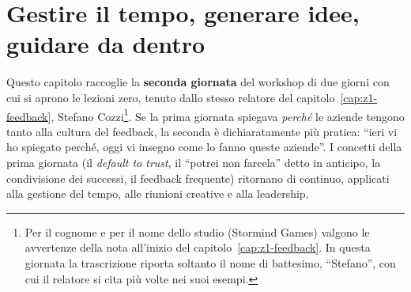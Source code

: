 %
%
%    
%    
%    
%

\chapter[Tempo, idee e leadership]{Gestire il tempo, generare idee, guidare da dentro}
\label{cap:z2-tempo-idee-leadership}

Questo capitolo raccoglie la \textbf{seconda giornata} del workshop di due
giorni con cui si aprono le lezioni zero, tenuto dallo stesso relatore del
capitolo~\ref{cap:z1-feedback}, Stefano Cozzi\footnote{Per il cognome e per
il nome dello studio (Stormind Games) valgono le avvertenze della nota
all'inizio del capitolo~\ref{cap:z1-feedback}. In questa giornata la
trascrizione riporta soltanto il nome di battesimo, ``Stefano'', con cui il
relatore si cita più volte nei suoi esempi.}. Se la prima giornata spiegava
\emph{perché} le aziende tengono tanto alla cultura del feedback, la seconda
è dichiaratamente più pratica: ``ieri vi ho spiegato perché, oggi vi insegno
come lo fanno queste aziende''. I concetti della prima giornata (il
\emph{default to trust}, il ``potrei non farcela'' detto in anticipo, la
condivisione dei successi, il feedback frequente) ritornano di continuo,
applicati alla gestione del tempo, alle riunioni creative e alla leadership.

